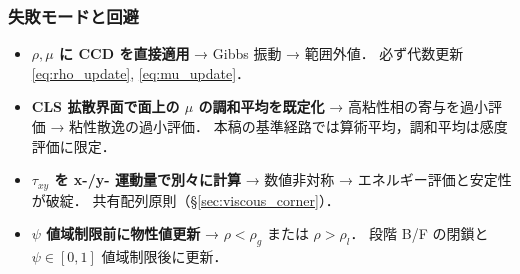\subsubsection{失敗モードと回避}
\label{sec:rho_mu_failure_modes}

\begin{itemize}
  \item \textbf{$\rho, \mu$ に CCD を直接適用} → Gibbs 振動 → 範囲外値．
        必ず代数更新 \eqref{eq:rho_update}, \eqref{eq:mu_update}．
  \item \textbf{CLS 拡散界面で面上の $\mu$ の調和平均を既定化} → 高粘性相の寄与を過小評価
        → 粘性散逸の過小評価．
        本稿の基準経路では算術平均，調和平均は感度評価に限定．
  \item \textbf{$\tau_{xy}$ を x-/y- 運動量で別々に計算} → 数値非対称
        → エネルギー評価と安定性が破綻．
        共有配列原則（\S\ref{sec:viscous_corner}）．
  \item \textbf{$\psi$ 値域制限前に物性値更新} → $\rho<\rho_g$ または $\rho>\rho_l$．
        段階 B/F の閉鎖と $\psi\in[0,1]$ 値域制限後に更新．
\end{itemize}

